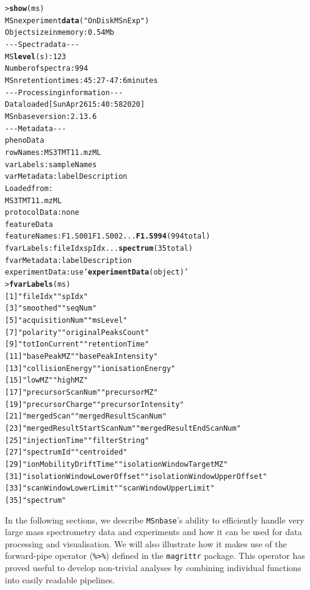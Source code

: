 \documentclass[journal=jacsat,manuscript=article]{achemso}\usepackage[]{graphicx}\usepackage[]{color}
\makeatletter
\newcommand{\hlstr}[1]{\textcolor[rgb]{0.192,0.494,0.8}{#1}}%
\newcommand{\hlkwd}[1]{\textcolor[rgb]{0.737,0.353,0.396}{\textbf{#1}}}%
\newenvironment{kframe}{%
 \def\at@end@of@kframe{}%
 \ifinner\ifhmode%
  \def\at@end@of@kframe{\end{minipage}}%
  \begin{minipage}{\columnwidth}%
 \fi\fi%
 \def\FrameCommand##1{\hskip\@totalleftmargin \hskip-\fboxsep
 \colorbox{shadecolor}{##1}\hskip-\fboxsep
     \hskip-\linewidth \hskip-\@totalleftmargin \hskip\columnwidth}%
 \MakeFramed {\advance\hsize-\width
   \@totalleftmargin\z@ \linewidth\hsize
   \@setminipage}}%
 {\par\unskip\endMakeFramed%
 \at@end@of@kframe}
\newenvironment{knitrout}{}{} %
\makeatother
\begin{document}
\begin{knitrout}
\color{fgcolor}\begin{kframe}
\begin{alltt}
> \hlkwd{show}(ms)
MSn experiment \hlkwd{data} (\hlstr{"OnDiskMSnExp"})
Object size in memory: 0.54 Mb
- - - Spectra data - - -
 MS \hlkwd{level}(s): 1 2 3 
 Number of spectra: 994 
 MSn retention times: 45:27 - 47:6 minutes
- - - Processing information - - -
Data loaded [Sun Apr 26 15:40:58 2020] 
 MSnbase version: 2.13.6 
- - - Meta data  - - -
phenoData
  rowNames: MS3TMT11.mzML
  varLabels: sampleNames
  varMetadata: labelDescription
Loaded from:
  MS3TMT11.mzML 
protocolData: none
featureData
  featureNames: F1.S001 F1.S002 ... \hlkwd{F1.S994} (994 total)
  fvarLabels: fileIdx spIdx ... \hlkwd{spectrum} (35 total)
  fvarMetadata: labelDescription
experimentData: use \hlstr{'\hlkwd{experimentData}(object)'}
> \hlkwd{fvarLabels}(ms)
 [1] \hlstr{"fileIdx"}                    \hlstr{"spIdx"}
 [3] \hlstr{"smoothed"}                   \hlstr{"seqNum"}
 [5] \hlstr{"acquisitionNum"}             \hlstr{"msLevel"}
 [7] \hlstr{"polarity"}                   \hlstr{"originalPeaksCount"}
 [9] \hlstr{"totIonCurrent"}              \hlstr{"retentionTime"}
[11] \hlstr{"basePeakMZ"}                 \hlstr{"basePeakIntensity"}
[13] \hlstr{"collisionEnergy"}            \hlstr{"ionisationEnergy"}
[15] \hlstr{"lowMZ"}                      \hlstr{"highMZ"}
[17] \hlstr{"precursorScanNum"}           \hlstr{"precursorMZ"}
[19] \hlstr{"precursorCharge"}            \hlstr{"precursorIntensity"}
[21] \hlstr{"mergedScan"}                 \hlstr{"mergedResultScanNum"}
[23] \hlstr{"mergedResultStartScanNum"}   \hlstr{"mergedResultEndScanNum"}
[25] \hlstr{"injectionTime"}              \hlstr{"filterString"}
[27] \hlstr{"spectrumId"}                 \hlstr{"centroided"}
[29] \hlstr{"ionMobilityDriftTime"}       \hlstr{"isolationWindowTargetMZ"}
[31] \hlstr{"isolationWindowLowerOffset"} \hlstr{"isolationWindowUpperOffset"}
[33] \hlstr{"scanWindowLowerLimit"}       \hlstr{"scanWindowUpperLimit"}
[35] \hlstr{"spectrum"}
\end{alltt}
\end{kframe}
\end{knitrout}

In the following sections, we describe \texttt{MSnbase}'s ability to
efficiently handle very large mass spectrometry data and experiments
and how it can be used for data processing and visualisation. We will
also illustrate how it makes use of the forward-pipe operator
(\texttt{\%>\%}) defined in the \texttt{magrittr} package. This
operator has proved useful to develop non-trivial analyses by
combining individual functions into easily readable pipelines.
\end{document}
